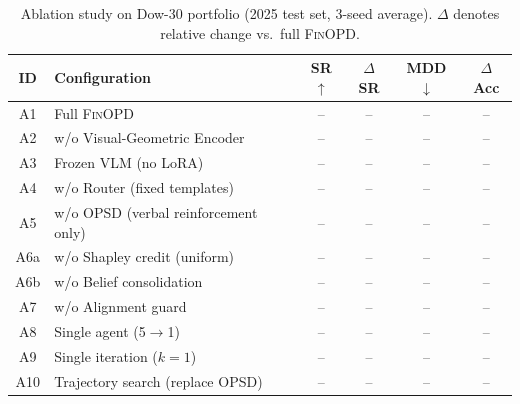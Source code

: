 \begin{table}[t]
\renewcommand{\arraystretch}{0.95}
\footnotesize
\caption{Ablation study on Dow-30 portfolio (2025 test set, 3-seed average). $\Delta$ denotes relative change vs.\ full \textsc{FinOPD}.}
\setlength{\abovecaptionskip}{0.1cm}
\centering
\setlength{\tabcolsep}{3pt}
\begin{tabular}{clcccc}
\toprule
ID & Configuration & SR$\uparrow$ & $\Delta$SR & MDD$\downarrow$ & $\Delta$Acc \\
\midrule
A1 & Full \textsc{FinOPD} & -- & -- & -- & -- \\
\midrule
A2 & w/o Visual-Geometric Encoder & -- & -- & -- & -- \\
A3 & Frozen VLM (no LoRA) & -- & -- & -- & -- \\
A4 & w/o Router (fixed templates) & -- & -- & -- & -- \\
A5 & w/o OPSD (verbal reinforcement only) & -- & -- & -- & -- \\
A6a & w/o Shapley credit (uniform) & -- & -- & -- & -- \\
A6b & w/o Belief consolidation & -- & -- & -- & -- \\
A7 & w/o Alignment guard & -- & -- & -- & -- \\
A8 & Single agent (5$\to$1) & -- & -- & -- & -- \\
A9 & Single iteration ($k{=}1$) & -- & -- & -- & -- \\
A10 & Trajectory search (replace OPSD) & -- & -- & -- & -- \\
\bottomrule
\end{tabular}
\label{tab:ablation}
\end{table}
